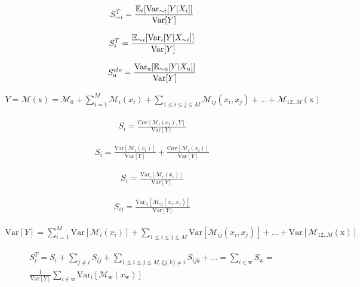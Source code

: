 \begin{align}
S_{\sim i}^T = \frac{\operatorname*{\mathbb{E}}_{i}[\text{Var}_{\sim i}[Y|X_i]]}{\text{Var}[Y]}
\end{align}

\begin{align}
S_{i}^T = \frac{\operatorname*{\mathbb{E}}_{\sim i}[\text{Var}_{i}[Y|X_{\sim i}]]}{\text{Var}[Y]}
\end{align}

\begin{align}
S_\text{u}^{clo} = \frac{\text{Var}_\text{u}[\operatorname*{\mathbb{E}}_{\sim \text{u}}[Y|X_\text{u} ]]}{\text{Var}[Y]}
\end{align}


\begin{align}
Y = \mathcal{M}(\text{x}) = \mathcal{M}_0 + \sum_{i=1}^{M} \mathcal{M}_i(x_i) + \sum_{1 \leq i \leq j \leq M} \mathcal{M}_{ij}(x_i,x_j) + ... + \mathcal{M}_{12..M}(\text{x})
\end{align}

\begin{align}
S_i = \frac{\text{Cov}[\mathcal{M}_i(x_i), Y]}{\text{Var}[Y]}
\end{align}

\begin{align}
S_i = \frac{\text{Var}[\mathcal{M}_i(x_i)]}{\text{Var}[Y]} + \frac{\text{Cov}[\mathcal{M}_i(x_i)]}{\text{Var}[Y]}
\end{align}

\begin{align}
S_i = \frac{\text{Var}_i[\mathcal{M}_i(x_i)]}{\text{Var}[Y]}
\end{align}

\begin{align}
S_{ij} = \frac{\text{Var}_{ij}[\mathcal{M}_{ij}(x_i,x_j)]}{\text{Var}[Y]}
\end{align}

\begin{align}
\text{Var}[Y] =  \sum_{i=1}^{M} \text{Var}[\mathcal{M}_i(x_i)] + \sum_{1 \leq i \leq j \leq M} \text{Var}[\mathcal{M}_{ij}(x_i,x_j)] + ... + \text{Var}[\mathcal{M}_{12..M}(\text{x})]
\end{align}

\begin{equation}
\begin{aligned}
S_i^T = S_i + \sum_{j \ne i} S_{ij} + \sum_{1 \leq i \leq j \leq M,\{j,k\} \ne i} S_{ijk} + ... = \sum_{i \in \text{w}} S_\text{w} = \\
\frac{1}{\text{Var}[Y]}\sum_{i \in \text{w}} \text{Var}_i[\mathcal{M}_\text{w}(x_\text{w})]
\end{aligned}
\end{equation}

